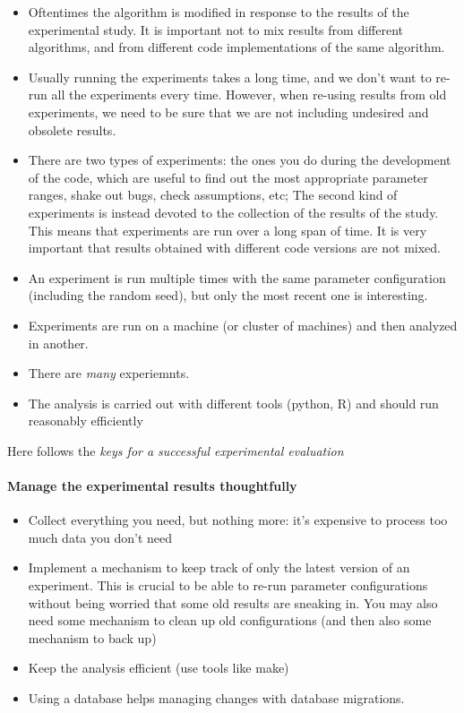 \documentclass{llncs}
\begin{document}
\begin{itemize}
\item Oftentimes the algorithm is modified in response to the results
  of the experimental study. It is important not to mix results from
  different algorithms, and from different code implementations of the
  same algorithm.
\item Usually running the experiments takes a long time, and we don't
  want to re-run all the experiments every time. However, when
  re-using results from old experiments, we need to be sure that we
  are not including undesired and obsolete results.
\item There are two types of experiments: the ones you do during the
  development of the code, which are useful to find out the most
  appropriate parameter ranges, shake out bugs, check assumptions,
  etc; The second kind of experiments is instead devoted to the
  collection of the results of the study. This means that experiments
  are run over a long span of time. It is very important that results
  obtained with different code versions are not mixed.
\item An experiment is run multiple times with the same parameter
  configuration (including the random seed), but only the most recent
  one is interesting.
\item Experiments are run on a machine (or cluster of machines) and then
  analyzed in another.
\item There are \emph{many} experiemnts.
\item The analysis is carried out with different tools (python, R) and
  should run reasonably efficiently
\end{itemize}

Here follows the \emph{keys for a successful experimental evaluation}

\paragraph{Manage the experimental results thoughtfully}

\begin{itemize}
\item Collect everything you need, but nothing more: it's expensive to process too
  much data you don't need
\item Implement a mechanism to keep track of only the latest version of an
  experiment. This is crucial to be able to re-run parameter configurations
  without being worried that some old results are sneaking in. You may also
  need some mechanism to clean up old configurations (and then also some
  mechanism to back up)
\item Keep the analysis efficient (use tools like make)
\item Using a database helps managing changes with database migrations.
\end{itemize}
\end{document}
